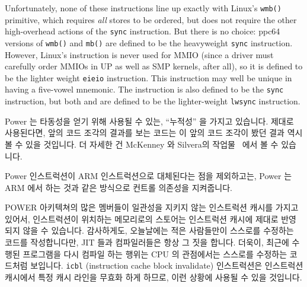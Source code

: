 Unfortunately, none of these instructions line up exactly with Linux's
{\tt wmb()} primitive, which requires {\em all} stores to be ordered,
but does not require the other high-overhead actions of the {\tt sync}
instruction.
But there is no choice: ppc64 versions of {\tt wmb()} and {\tt mb()} are
defined to be the heavyweight {\tt sync} instruction.
However, Linux's  instruction is never used for MMIO
(since a driver must carefully order MMIOs in UP as well as
SMP kernels, after all), so it is defined to be the lighter weight
{\tt eieio} instruction.
This instruction may well be unique in having a five-vowel mnemonic.
The  instruction is also defined to be the {\tt sync}
instruction, but both  and  are defined to
be the lighter-weight {\tt lwsync} instruction.
\fi

Power 는 타동성을 얻기 위해 사용될 수 있는, ``누적성'' 을 가지고 있습니다.
제대로 사용된다면, 앞의 코드 조각의 결과를 보는 코드는 이 앞의 코드 조각이 봤던
결과 역시 볼 수 있을 것입니다.
더 자세한 건 McKenney 와 Silvera의 작업물~\cite{PaulEMcKenneyN2745r2009} 에서
볼 수 있습니다.

Power  인스트럭션이 ARM  인스트럭션으로 대체된다는 점을
제외하고는, Power 는 ARM 에서 하는 것과 같은 방식으로 컨트롤 의존성을
지켜줍니다.

POWER 아키텍쳐의 많은 멤버들이 일관성을 지키지 않는 인스트럭션 캐시를 가지고
있어서, 인스트럭션이 위치하는 메모리로의 스토어는 인스트럭션 캐시에 제대로
반영되지 않을 수 있습니다.
감사하게도, 오늘날에는 적은 사람들만이 스스로를 수정하는 코드를 작성합니다만,
JIT 들과 컴파일러들은 항상 그 짓을 합니다.
더욱이, 최근에 수행된 프로그램을 다시 컴파일 하는 행위는 CPU 의 관점에서는
스스로를 수정하는 코드처럼 보입니다.
{\tt icbl} (instruction cache block invalidate) 인스트럭션은 인스트럭션
캐시에서 특정 캐시 라인을 무효화 하게 하므로, 이런 상황에 사용될 수 있을
것입니다.

